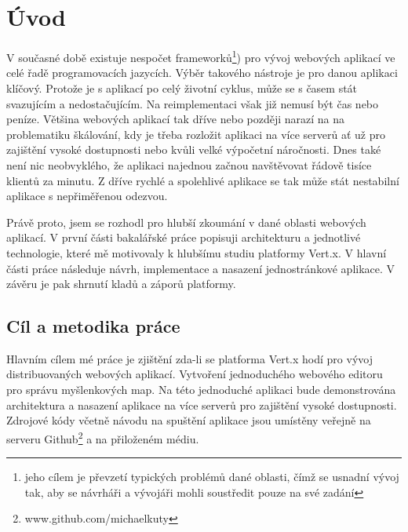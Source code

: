 

\chapter{Úvod}

V současné době existuje nespočet frameworků\footnote{jeho cílem je převzetí typických problémů dané oblasti, čímž se usnadní vývoj tak, aby se návrháři a vývojáři mohli soustředit pouze na své zadání}) pro vývoj webových aplikací ve celé řadě programovacích jazycích. 
Výběr takového nástroje je pro danou aplikaci klíčový. Protože je s aplikací po celý životní cyklus, může se s časem stát svazujícím a nedostačujícím. Na reimplementaci však již nemusí být čas nebo peníze. Většina webových aplikací tak dříve nebo později narazí na na problematiku škálování, kdy je třeba rozložit aplikaci na více serverů ať už pro zajištění vysoké dostupnosti nebo kvůli velké výpočetní náročnosti. Dnes také není nic neobvyklého, že aplikaci najednou začnou navštěvovat řádově tisíce klientů za minutu. Z dříve rychlé a spolehlivé aplikace se tak může stát nestabilní aplikace s nepřiměřenou odezvou.

Právě proto, jsem se rozhodl pro hlubší zkoumání v dané oblasti webových aplikací. V první části bakalářské práce popisuji architekturu a jednotlivé technologie, které mě motivovaly k hlubšímu studiu platformy Vert.x. V hlavní části práce následuje návrh, implementace a nasazení jednostránkové aplikace. V závěru je pak shrnutí kladů a záporů platformy.

\section{Cíl a metodika práce}

Hlavním cílem mé práce je zjištění zda-li se platforma Vert.x hodí pro vývoj distribuovaných webových aplikací. 
Vytvoření jednoduchého webového editoru pro správu myšlenkových map. %
Na této jednoduché aplikaci bude demonstrována architektura a nasazení aplikace na více serverů pro zajištění vysoké dostupnosti.
Zdrojové kódy včetně návodu na spuštění aplikace jsou umístěny veřejně na serveru Github\footnote{www.github.com/michaelkuty} a na přiloženém médiu.

